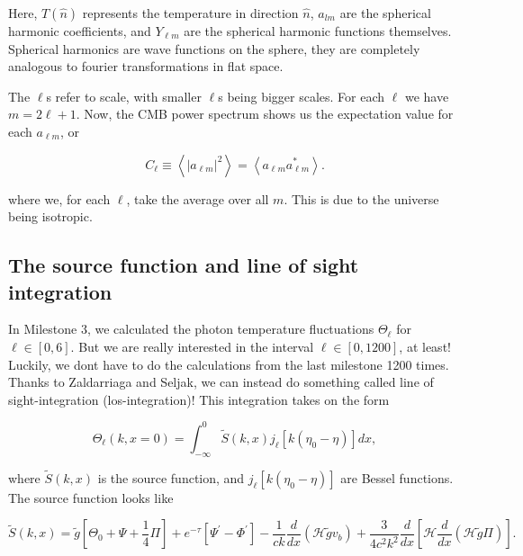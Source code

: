 \documentclass[12pt]{article}
\begin{document}
Here, $T(\hat{n})$ represents the temperature in direction $\hat{n}$, $a_{lm}$ are the spherical harmonic coefficients, and $Y_{\ell m}$ are the spherical harmonic functions themselves. Spherical harmonics are wave functions on the sphere, they are completely analogous to fourier transformations in flat space. 

The $\ell$s refer to scale, with smaller $\ell$s being bigger scales. For each $\ell$ we have $m=2\ell + 1$. Now, the CMB power spectrum shows us the expectation value for each $a_{\ell m}$, or

\begin{equation}
    C_{\ell} \equiv\left\langle\left|a_{\ell m}\right|^{2}\right\rangle=\left\langle a_{\ell m} a_{\ell m}^{*}\right\rangle.
\end{equation}

where we, for each $\ell$, take the average over all $m$. This is due to the universe being isotropic. 

\subsection{The source function and line of sight integration}
In Milestone 3, we calculated the photon temperature fluctuations $\Theta_\ell$ for $\ell \in [0,6]$. But we are really interested in the interval $\ell \in [0,1200]$, at least! Luckily, we dont have to do the calculations from the last milestone 1200 times. Thanks to Zaldarriaga  and Seljak, we can instead do something called line of sight-integration (los-integration)! This integration takes on the form

\begin{equation}\label{eq: line of sight integration}
    \Theta_{\ell}(k, x=0)=\int_{-\infty}^{0} \tilde{S}(k, x) j_{\ell}\left[k\left(\eta_{0}-\eta\right)\right] d x,
\end{equation}

where $\tilde{S}(k, x)$ is the source function, and $j_{\ell}\left[k\left(\eta_{0}-\eta\right)\right]$ are Bessel functions. The source function looks like

\begin{equation}\label{eq: source function}
    \tilde{S}(k, x)=\tilde{g}\left[\Theta_{0}+\Psi+\frac{1}{4} \Pi\right]+e^{-\tau}\left[\Psi^{\prime}-\Phi^{\prime}\right]-\frac{1}{c k} \frac{d}{d x}\left(\mathcal{H} \tilde{g} v_{b}\right)+\frac{3}{4 c^{2} k^{2}} \frac{d}{d x}\left[\mathcal{H} \frac{d}{d x}(\mathcal{H} \tilde{g} \Pi)\right].
\end{equation}
\end{document}
